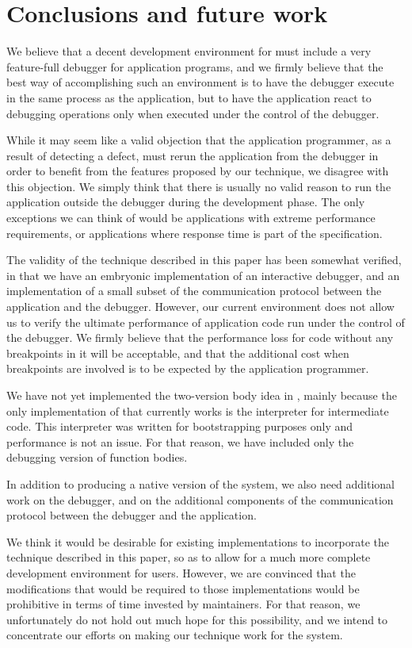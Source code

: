 \section{Conclusions and future work}

We believe that a decent development environment for \commonlisp{}
must include a very feature-full debugger for application programs, and
we firmly believe that the best way of accomplishing such an
environment is to have the debugger execute in the same process as the
application, but to have the application react to debugging operations
only when executed under the control of the debugger.

While it may seem like a valid objection that the application
programmer, as a result of detecting a defect, must rerun the
application from the debugger in order to benefit from the features
proposed by our technique, we disagree with this objection.  We simply
think that there is usually no valid reason to run the application
outside the debugger during the development phase.  The only
exceptions we can think of would be applications with extreme
performance requirements, or applications where response time is part
of the specification.

The validity of the technique described in this paper has been
somewhat verified, in that we have an embryonic implementation of an
interactive debugger, and an implementation of a small subset of the
communication protocol between the application and the debugger.
However, our current environment does not allow us to verify the
ultimate performance of application code run under the control of the
debugger.  We firmly believe that the performance loss for code
without any breakpoints in it will be acceptable, and that the
additional cost when breakpoints are involved is to be expected by the
application programmer.

We have not yet implemented the two-version body idea
 in \sicl{},
mainly because the only implementation of \sicl{} that currently works
is the interpreter for intermediate code.  This interpreter was
written for bootstrapping purposes only and performance is not an
issue.  For that reason, we have included only the debugging version
of function bodies.

In addition to producing a native version of the \sicl{} system, we
also need additional work on the \clordane{} debugger, and on the
additional components of the communication protocol between the
debugger and the application.

We think it would be desirable for existing \commonlisp{}
implementations to incorporate the technique described in this paper,
so as to allow for a much more complete development environment for
users.  However, we are convinced that the modifications that would be
required to those implementations would be prohibitive in terms of
time invested by maintainers.  For that reason, we unfortunately do
not hold out much hope for this possibility, and we intend to
concentrate our efforts on making our technique work for the \sicl{}
system.
